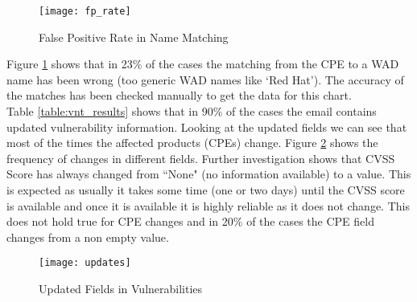 \begin{figure}[h!]
  \centering
    \texttt{[image: fp\_rate]}
  \caption{False Positive Rate in Name Matching}
  \label{figure:fp_rate}

\end{figure}


Figure \ref{figure:fp_rate} shows that in 23\% of the cases the matching from the CPE to a WAD name has been wrong (too generic WAD names like `Red Hat'). The accuracy of the matches has been checked manually to get the data for this chart.
\\
Table \ref{table:vnt_results} shows that in 90\%  of the cases the email contains updated vulnerability information. Looking at the updated fields we can see that most of the times the affected products (CPEs) change. Figure \ref{figure:updates} shows the frequency of changes in different fields. Further investigation shows that CVSS Score has always changed from ``None" (no information available) to a value. This is expected as usually it takes some time (one or two days) until the CVSS score is available and once it is available it is highly reliable as it does not change. This does not hold true for CPE changes and in 20\% of the cases the CPE field changes from a non empty value.




\begin{figure}[h!]
  \centering
    \texttt{[image: updates]}
  \caption{Updated Fields in Vulnerabilities}
  \label{figure:updates}

\end{figure}
















